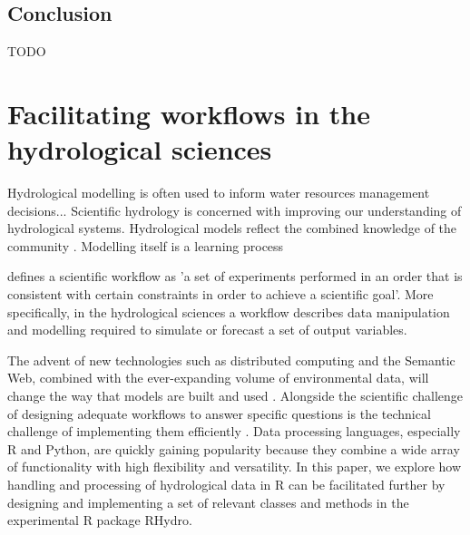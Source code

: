 \documentclass{icldt}\usepackage[]{graphicx}\usepackage[]{color}
\begin{document}
\section{Conclusion}
TODO




\chapter{Facilitating workflows in the hydrological sciences}


Hydrological modelling is often used to inform water resources management decisions... Scientific hydrology is concerned with improving our understanding of hydrological systems. Hydrological models reflect the combined knowledge of the community \citep{}. Modelling itself is a learning process \citep{box1976}

\citet{shao2009} defines a scientific workflow as 'a set of experiments performed in an order that is consistent with certain constraints in order to achieve a scientific goal'. More specifically, in the hydrological sciences a workflow describes data manipulation and modelling required to simulate or forecast a set of output variables.

The advent of new technologies such as distributed computing and the Semantic Web, combined with the ever-expanding volume of environmental data, will change the way that models are built and used \citep{beven2007,salas2012,bastin2012}. Alongside the scientific challenge of designing adequate workflows to answer specific questions is the technical challenge of implementing them efficiently \citep{vitolo?}. Data processing languages, especially R \citep{R2015} and Python, are quickly gaining popularity because they combine a wide array of functionality with high flexibility and versatility. In this paper, we explore how handling and processing of hydrological data in R can be facilitated further by designing and implementing a set of relevant classes and methods in the experimental R package RHydro. \\

\end{document}
